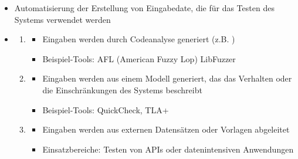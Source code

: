 \begin{infoBox}[title=Generierung von Testeingaben]
    \begin{itemize}
        \item {} Automatisierung der Erstellung von Eingabedate, die für das Testen des Systems verwendet werden
        \item {}
        \begin{enumerate}
            \item {}
            \begin{itemize}
                \item Eingaben werden durch Codeanalyse generiert (z.B. )
                \item Beispiel-Tools: AFL (American Fuzzy Lop) LibFuzzer
            \end{itemize}
            \item {}
            \begin{itemize}
                \item Eingaben werden aus einem Modell generiert, das das Verhalten oder die Einschränkungen des Systems beschreibt
                \item Beispiel-Tools: QuickCheck, TLA+
            \end{itemize}
            \item {}
            \begin{itemize}
                \item Eingaben werden aus externen Datensätzen oder Vorlagen abgeleitet
                \item Einsatzbereiche: Testen von APIs oder datenintensiven Anwendungen
            \end{itemize}
        \end{enumerate}
    \end{itemize}
\end{infoBox}
